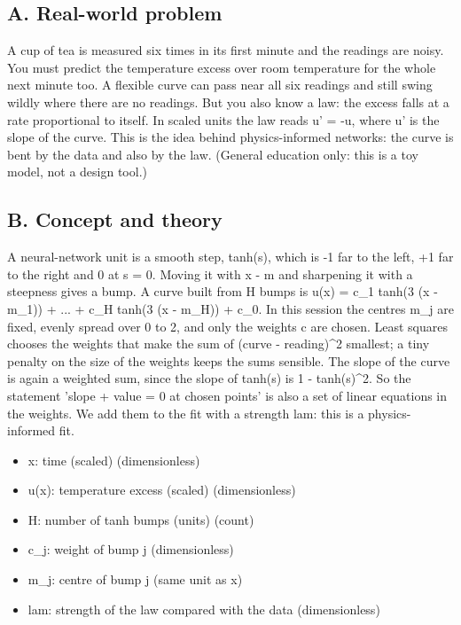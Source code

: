 \documentclass[11pt,a4paper]{article}
\begin{document}
\subsection*{A. Real-world problem}
A cup of tea is measured six times in its first minute and the readings are noisy. You must predict the temperature excess over room temperature for the whole next minute too. A flexible curve can pass near all six readings and still swing wildly where there are no readings. But you also know a law: the excess falls at a rate proportional to itself. In scaled units the law reads u' = -u, where u' is the slope of the curve. This is the idea behind physics-informed networks: the curve is bent by the data and also by the law. (General education only: this is a toy model, not a design tool.)

\subsection*{B. Concept and theory}
A neural-network unit is a smooth step, tanh(s), which is -1 far to the left, +1 far to the right and 0 at s = 0. Moving it with x - m and sharpening it with a steepness gives a bump. A curve built from H bumps is u(x) = c\_1 tanh(3 (x - m\_1)) + ... + c\_H tanh(3 (x - m\_H)) + c\_0. In this session the centres m\_j are fixed, evenly spread over 0 to 2, and only the weights c are chosen. Least squares chooses the weights that make the sum of (curve - reading)\textasciicircum{}2 smallest; a tiny penalty on the size of the weights keeps the sums sensible. The slope of the curve is again a weighted sum, since the slope of tanh(s) is 1 - tanh(s)\textasciicircum{}2. So the statement 'slope + value = 0 at chosen points' is also a set of linear equations in the weights. We add them to the fit with a strength lam: this is a physics-informed fit.

\begin{itemize}[nosep]
\item x: time (scaled) (dimensionless)
\item u(x): temperature excess (scaled) (dimensionless)
\item H: number of tanh bumps (units) (count)
\item c\_j: weight of bump j (dimensionless)
\item m\_j: centre of bump j (same unit as x)
\item lam: strength of the law compared with the data (dimensionless)
\end{itemize}
\end{document}

